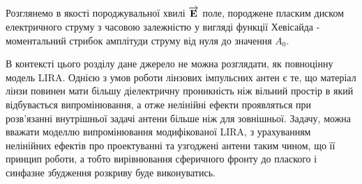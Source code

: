 Розглянемо в якості породжувальної хвилі $ \overrightarrow{\mathbf E} $ поле, породжене 
пласким диском електричного струму з часовою залежністю у вигляді 
функції Хевісайда - моментальний стрибок амплітуди струму від нуля до 
значення $ A_0 $. 

В контексті цього розділу дане джерело не можна розглядати, як повноцінну 
модель LIRA. Однією з умов роботи лінзових імпульсних антен є те, що матеріал 
лінзи повинен мати більшу діелектричну проникність ніж вільний простір в який 
відбувається випромінювання, а отже нелінійні ефекти проявляться при 
розв'язанні внутрішньої задачі антени більше ніж для зовнішньої. Задачу,
можна вважати моделлю випромінювання модифікованої LIRA, з урахуванням 
нелінійних ефектів про проектуванні та узгоджені антени таким чином, що
її принцип роботи, а тобто вирівнювання сферичного фронту до плаского і 
синфазне збудження розкриву буде виконуватись.

